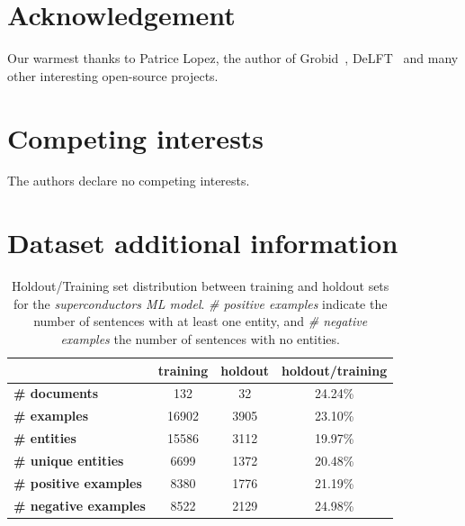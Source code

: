 \documentclass[]{interact}
\theoremstyle{plain}%
\theoremstyle{definition}
\theoremstyle{remark}
\begin{document}
\section*{Acknowledgement}
\label{sec:acknowledgement}
Our warmest thanks to Patrice Lopez, the author of Grobid~\cite{GROBID}, DeLFT~\citep{DeLFT} and many other interesting open-source projects.



\section*{Competing interests}

The authors declare no competing interests.





\appendix

\section{Dataset additional information}

\begin{table}[ht]
    \centering\small
    \begin{tabular}{lccc}
        \toprule
                                      & \textbf{training} & \textbf{holdout} & \textbf{holdout/training} \\
        \midrule
        \textbf{\# documents}         & 132               & 32               & 24.24\%                   \\
        \textbf{\# examples}          & 16902             & 3905             & 23.10\%                   \\
        \textbf{\# entities}          & 15586             & 3112             & 19.97\%                   \\
        \textbf{\# unique entities}   & 6699              & 1372             & 20.48\%                   \\
        \textbf{\# positive examples} & 8380              & 1776             & 21.19\%                   \\
        \textbf{\# negative examples} & 8522              & 2129             & 24.98\%                   \\
        \bottomrule
    \end{tabular}

    \caption{Holdout/Training set distribution between training and holdout sets for the \textit{superconductors ML model}. \textit{\# positive examples} indicate the number of sentences with at least one entity, and \textit{\# negative examples} the number of sentences with no entities.}
    \label{tab:training-holdout-set-distribution-annex}
\end{table}
\end{document}
